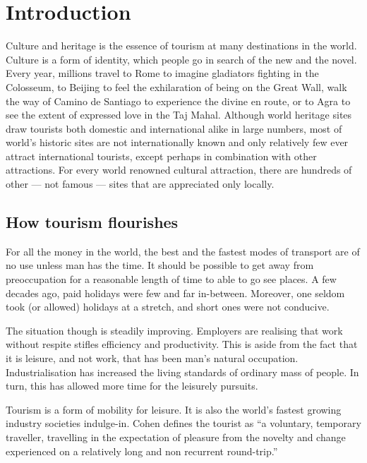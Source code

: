 \chapter{Introduction} %
\label{cha:intro}


Culture and heritage is the essence of tourism at many destinations in the world. Culture is a form of identity, which people go in search of the new and the novel. Every year, millions travel to Rome to imagine gladiators fighting in the Colosseum, to Beijing to feel the exhilaration of being on the Great Wall, walk the way of Camino de Santiago to experience the divine en route, or to Agra to see the extent of expressed love in the Taj Mahal. Although world heritage sites draw tourists both domestic and international alike in large numbers, most of world's historic sites are not internationally known and only relatively few ever attract international tourists, except perhaps in combination with other attractions. For every world renowned cultural attraction, there are hundreds of other --- not famous --- sites that are appreciated only locally.

\section{How tourism flourishes} %
\label{sec:htf}

For all the money in the world, the best and the fastest modes of transport are of no use unless man has the time. It should be possible to get away from preoccupation for a reasonable length of time to able to go see places. A few decades ago, paid holidays were few and far in-between. Moreover, one seldom took (or allowed) holidays at a stretch, and short ones were not conducive.

The situation though is steadily improving. Employers are realising that work without respite stifles efficiency and productivity. This is aside from the fact that it is leisure, and not work, that has been man's natural occupation. Industrialisation has increased the living standards of ordinary mass of people. In turn, this has allowed more time for the leisurely pursuits.

Tourism is a form of mobility for leisure. It is also the world's fastest growing industry societies indulge-in. Cohen defines the tourist as ``a voluntary, temporary traveller, travelling in the expectation of pleasure from the novelty and change experienced on a relatively long and non recurrent round-trip.''

